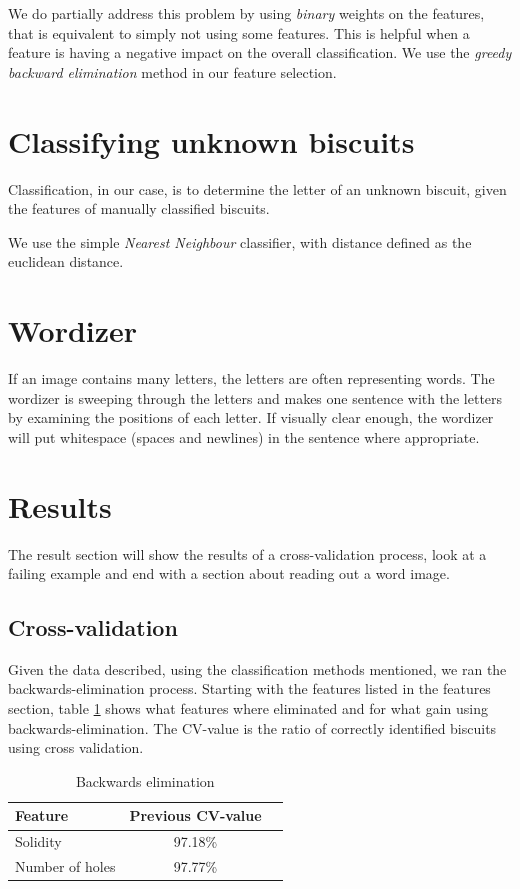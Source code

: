 \documentclass[a4paper,11pt]{article}
\begin{document}
We do partially address this problem by using \emph{binary} weights on the features, 
that is equivalent to simply not using some features.
This is helpful when a feature is having a negative impact on the overall classification.
We use the \emph{greedy backward elimination} method in our feature selection.
\section{Classifying unknown biscuits}
Classification, in our case, is to determine the letter of an unknown biscuit, given the features of manually classified biscuits.

We use the simple \emph{Nearest Neighbour} classifier, with distance defined as the euclidean distance.

\section{Wordizer}
If an image contains many letters, the letters are often representing words.
The wordizer is sweeping through the letters and makes one sentence with the letters by examining the positions of each letter.
If visually clear enough, the wordizer will put whitespace (spaces and newlines) in the sentence where appropriate.
\section{Results}
The result section will show the results of a cross-validation process, look at a failing example and end with a section about reading out a word image.
\subsection{Cross-validation}
Given the data described, using the classification methods mentioned, we ran the backwards-elimination process.
Starting with the features listed in the features section, table \ref{tab:backelim} shows what features
where eliminated and for what gain using backwards-elimination.
The CV-value is the ratio of correctly identified biscuits using cross validation.


\begin{table}[h!b!p!]
\caption{Backwards elimination}
\begin{center}
    \begin{tabular}{ | l | c | c | }
    Feature         & Previous CV-value \\ \hline
    Solidity        & 97.18\%           \\ \hline
    Number of holes & 97.77\%           \\ \hline
    \end{tabular}
\end{center}
\label{tab:backelim}
\end{table}
\end{document}
